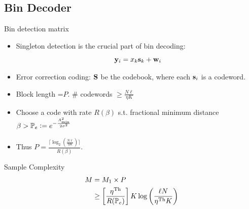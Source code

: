 \documentclass[10pt]{beamer}
\begin{document}
\subsection{Bin Decoder}
\begin{frame}{Bin detection matrix}
\begin{itemize}
\item Singleton detection is the crucial part of bin decoding:
\begin{equation*}
\mathbf{y}_i=x_{k}\mathbf{s}_k +\mathbf{w}_i
\end{equation*} 
\item Error correction coding: $\mathbf{S}$ be the codebook, where each $\mathbf{s}_i$ is a codeword.
\item Block length =$P$.  $\#$ codewords $\geq \frac{N\ell}{\eta K}$
\item Choose a code with rate $R(\beta)$ s.t. fractional minimum distance $\beta >\mathbb{P}_{e}\mathrel{\mathop:}= e^{-\frac{A_{\text{min}}^{2}}{2\sigma^2}}$
\item Thus $P=\frac{\lceil {\log_2(\frac{N\ell}{\eta K})}\rceil}{R(\beta)}$.
\end{itemize} 

\begin{block}{Sample Complexity}
 \begin{align*}
  M&=M_1\times P \\
   &\geq \left[\frac{\eta^{\text{Th}}}{R(\mathbb{P}_{e})}\right] K\log\left(\frac{\ell N}{\eta^{\text{Th}} K}\right)
\end{align*} 
\end{block}
\end{frame}
\end{document}
